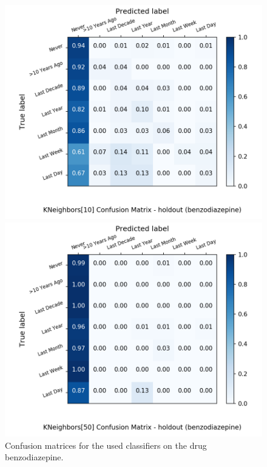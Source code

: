 \begin{figure}[H]
\begin{minipage}[b]{0.32\textwidth}
		\includegraphics[width=1.1\textwidth]{Plots/drugs/benzodiazepine_KNeighbors_10_balance_False_holdout.png}
  \end{minipage}
	\begin{minipage}[b]{0.32\textwidth}
		\includegraphics[width=1.1\textwidth]{Plots/drugs/benzodiazepine_KNeighbors_50_balance_False_holdout.png}
  \end{minipage}
	\caption{Confusion matrices for the used classifiers on the drug benzodiazepine.}
\end{figure}

